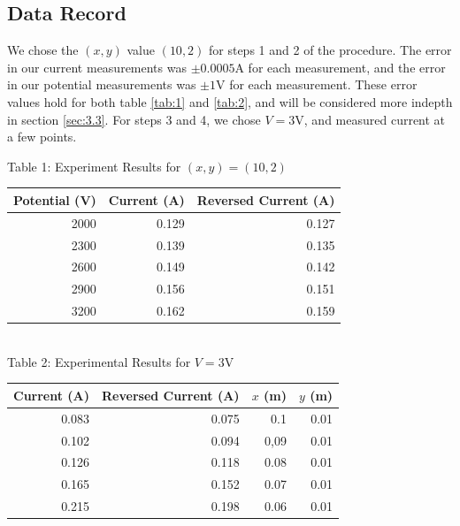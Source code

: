 \documentclass[11pt, letterpaper]{report}
\begin{document}
\subsection{Data Record}
We chose the $(x,y)$ value $(10,2)$ for steps 1 and 2 of the procedure. The error in our current measurements was $\pm 0.0005$A for each measurement, and the error in our potential measurements was $\pm 1$V for each measurement. These error values hold for both table \ref{tab:1} and \ref{tab:2}, and will be considered more indepth in section \ref{sec:3.3}. For steps 3 and 4, we chose $V=3$V, and measured current at a few points.
\begin{center}
	Table 1: Experiment Results for $(x,y)=(10,2)$\label{tab:1}\vspace{5pt}\\
	\begin{tabular}{rrr}
		\toprule
		Potential (V)&Current (A)&Reversed Current (A)\\
		\midrule
		2000&0.129&0.127\\
		2300&0.139&0.135\\
		2600&0.149&0.142\\
		2900&0.156&0.151\\
		3200&0.162&0.159\\
		\bottomrule
	\end{tabular}\vspace{10pt}\\
	\noindent Table 2: Experimental Results for $V=3$V\label{tab:2}\vspace{5pt}\\
	\begin{tabular}{rrrr}
		\toprule
		Current (A)&Reversed Current (A)&$x$ (m)&$y$ (m)\\
		\midrule
		0.083&0.075&0.1&0.01\\
		0.102&0.094&0,09&0.01\\
		0.126&0.118&0.08&0.01\\
		0.165&0.152&0.07&0.01\\
		0.215&0.198&0.06&0.01\\
		\bottomrule
	\end{tabular}
\end{center}
\end{document}
